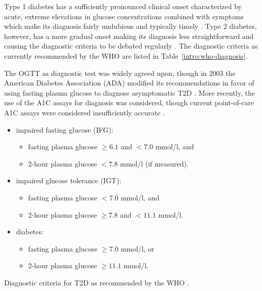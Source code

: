 Type 1 diabetes has a sufficiently pronounced clinical onset characterized by acute, extreme elevations in glucose concentrations combined with symptoms which make its diagnosis fairly undubious and typically timely \citep{international2009international}. Type 2 diabetes, however, has a more gradual onset making its diagnosis less straightforward and causing the diagnostic criteria to be debated regularly \citep{world2006definition, international2009international}.  The diagnostic criteria as currently recommended by the WHO are listed in Table~\ref{intro:who-diagnosis}.

The OGTT as diagnostic test was widely agreed upon, though in 2003 the American Diabetes Association (ADA) modified its recommendations in favor of using fasting plasma glucose to diagnose asymptomatic T2D \citep{world2006definition}. More recently, the use of the A1C assays for diagnosis was considered, though current point-of-care A1C assays were considered insufficiently accurate \citep{international2009international}.

\begin{table}[!h]
\colorbox{gray!20!white}{\parbox{\textwidth}{
\begin{itemize}
\item impaired fasting glucose (IFG):
\begin{itemize}
\item fasting plasma glucose $\geq 6.1$ and $< 7.0$ mmol/l, and
\item 2-hour plasma glucose $< 7.8$ mmol/l (if measured).
\end{itemize}
\item impaired glucose tolerance (IGT):
\begin{itemize}
\item fasting plasma glucose $< 7.0$ mmol/l, and
\item 2-hour plasma glucose $\geq 7.8$ and $< 11.1$ mmol/l.
\end{itemize}
\item diabetes:
\begin{itemize}
\item fasting plasma glucose $\geq 7.0$ mmol/l, or
\item 2-hour plasma glucose $\geq 11.1$ mmol/l.
\end{itemize}
\end{itemize}
}}
\caption{Diagnostic criteria for T2D as recommended by the WHO \citep{world2006definition}.} \label{intro:who-diagnosis}
\end{table}

